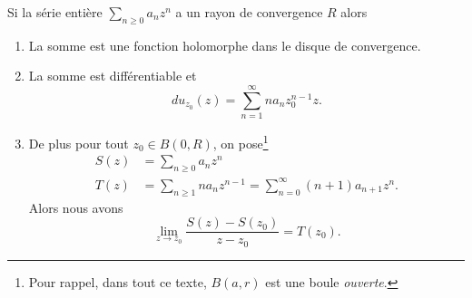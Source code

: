 \begin{proposition}     \label{PropSNMEooVgNqBP}
    Si la série entière \( \sum_{n\geq 0}a_nz^n\) a un rayon de convergence \( R\) alors
    \begin{enumerate}
        \item
            La somme est une fonction holomorphe dans le disque de convergence.
        \item       \label{ItemUULDooEGRNiA}
            La somme est différentiable et
            \begin{equation}
                du_{z_0}(z)=\sum_{n=1}^{\infty}na_nz_0^{n-1}z.
            \end{equation}
        \item
    De plus pour tout \( z_0\in B(0,R)\), on pose\footnote{Pour rappel, dans tout ce texte, \( B(a,r)\) est une boule \emph{ouverte}.}
    \begin{subequations}
        \begin{align}
            S(z)&=\sum_{n\geq 0}a_nz^n\\
            T(z)&=\sum_{n\geq 1}na_nz^{n-1}=\sum_{n=0}^{\infty}(n+1)a_{n+1}z^n.
        \end{align}
    \end{subequations}
    Alors  nous avons
    \begin{equation}    \label{EqVQDPooOPICwN}
        \lim_{z\to z_0}\frac{ S(z)-S(z_0) }{ z-z_0 }=T(z_0).
    \end{equation}
    \end{enumerate}
\end{proposition}

